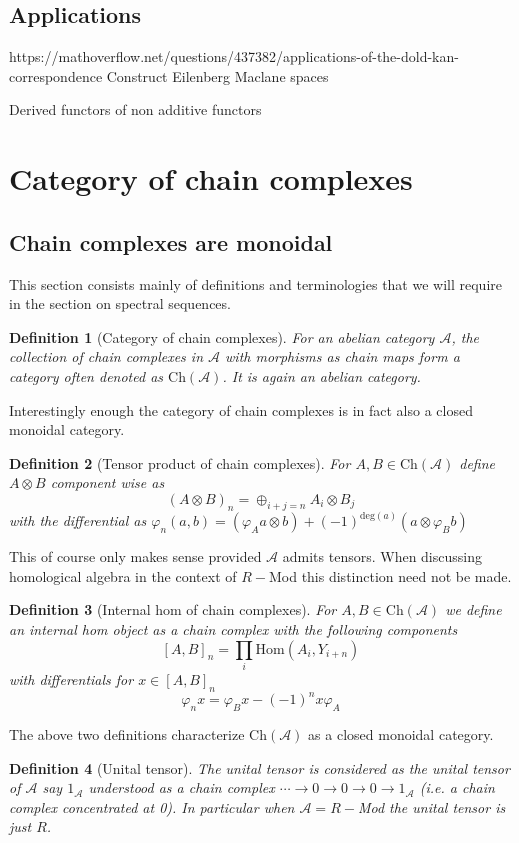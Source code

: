 \documentclass[12pt]{article}
\numberwithin{equation}{section}
\newtheorem{definition}{Definition}[section]
\begin{document}
	\subsection{Applications}
	https://mathoverflow.net/questions/437382/applications-of-the-dold-kan-correspondence
	Construct Eilenberg Maclane spaces
	
	Derived functors of non additive functors
	\section{Category of chain complexes}
	\subsection{Chain complexes are monoidal}
	This section consists mainly of definitions and terminologies that we will require in the section on spectral sequences.
	\begin{definition}[Category of chain complexes]
		For an abelian category $\mathcal{A}$, the collection of chain complexes in $\mathcal{A}$ with morphisms as chain maps form a category often denoted as $\mathrm{Ch}(\mathcal{A})$. It is again an abelian category.
	\end{definition}
	Interestingly enough the category of chain complexes is in fact also a closed monoidal category.
	
	\begin{definition}[Tensor product of chain complexes]\label{tensorchain}
		For $A, B \in \mathrm{Ch}(\mathcal{A})$ define $A \otimes B$ component wise as \[ (A \otimes B)_n = \oplus_{i+j=n} A_i \otimes B_j\] with the differential as $ \varphi_n(a,b)=(\varphi_Aa\otimes b)+(-1)^{\mathrm{deg}(a)}(a \otimes \varphi_B b)$
	\end{definition}
	This of course only makes sense provided $\mathcal{A}$ admits tensors. When discussing homological algebra in the context of $R-$Mod this distinction need not be made.
	
	\begin{definition}[Internal hom of chain complexes]\label{internalchain}
		For $A,B \in \mathrm{Ch}(\mathcal{A})$ we define an internal hom object as a chain complex with the following components
		\[ [A,B]_n=\prod_i \mathrm{Hom}(A_i,Y_{i+n})\]
		with differentials for $x \in [A,B]_n$
		\[ \varphi_n x= \varphi_B x-(-1)^n x \varphi_A \]
	\end{definition}
	The above two definitions characterize $\mathrm{Ch}(\mathcal{A})$ as a closed monoidal category. 
	\begin{definition}[Unital tensor]\label{chunittensor}
			The unital tensor is considered as the unital tensor of $\mathcal{A}$ say $1_\mathcal{A}$ understood as a chain complex $\cdots \to 0\to0 \to 0 \to 1_\mathcal{A}$ (i.e. a chain complex concentrated at 0). In particular when $\mathcal{A}=R-$Mod the unital tensor is just $R$.
	\end{definition}
\end{document}
